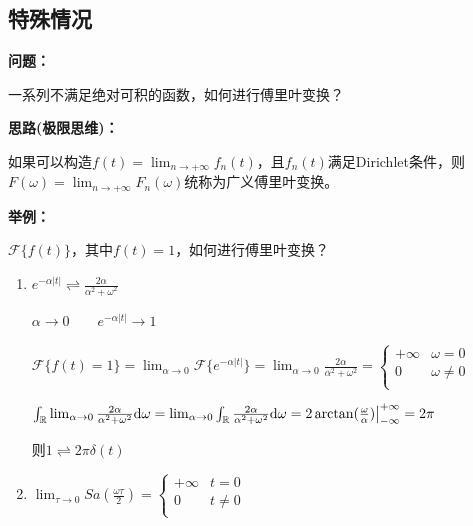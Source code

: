 \documentclass[UTF8]{ctexart}
\begin{document}
\subsection{特殊情况}
\noindent\textbf{问题：}\par
一系列不满足绝对可积的函数，如何进行傅里叶变换？\par
\noindent\textbf{思路(极限思维)：}\par
如果可以构造$f(t)=\lim_{n\to+\infty}f_n(t)$，且$f_n(t)$满足Dirichlet条件，则$F(\omega)=\lim_{n\to+\infty}F_n(\omega)$统称为广义傅里叶变换。\par
\noindent\textbf{举例：}\par
$\mathscr{F}\{f(t)\}$，其中$f(t)=1$，如何进行傅里叶变换？\par
\begin{enumerate}[label=(\arabic*),itemindent=0pt,labelindent=\parindent,labelwidth=2em,labelsep=5pt,leftmargin=*]
  \item $e^{-\alpha{|t|}}\rightleftharpoons\frac{2\alpha}{\alpha^2+\omega^2}$ \par
        $\alpha\rightarrow0\qquad e^{-\alpha{|t|}}\rightarrow1$ \par
        $\mathscr{F}\{f(t)=1\}=\lim_{\alpha\to0}\mathscr{F}\{e^{-\alpha{|t|}}\}
        =\lim_{\alpha\to0}\frac{2\alpha}{\alpha^2+\omega^2}=\left\{
        \begin{array}{cl}
          +\infty &  \omega=0 \\
          0 &  \omega\neq0 \\
        \end{array} \right. $ \par
        $\int_{\mathbb{R}}\lim_{\alpha\to0}\frac{2\alpha}{\alpha^2+\omega^2}{\rm{d}}\omega
        =\lim_{\alpha\to0}\int_{\mathbb{R}}\frac{2\alpha}{\alpha^2+\omega^2}{\rm{d}}\omega
        =2\arctan(\frac{\omega}{\alpha})\big{|}_{-\infty}^{+\infty}=2\pi$ \par
        则$1\rightleftharpoons2\pi\delta(t)$
  \item $\lim_{\tau\to0}Sa(\frac{\omega\tau}{2})=\left\{
        \begin{array}{cl}
          +\infty &  t=0 \\
          0 &  t\neq0 \\
        \end{array} \right. $ \par
\end{enumerate}\par
\end{document}
